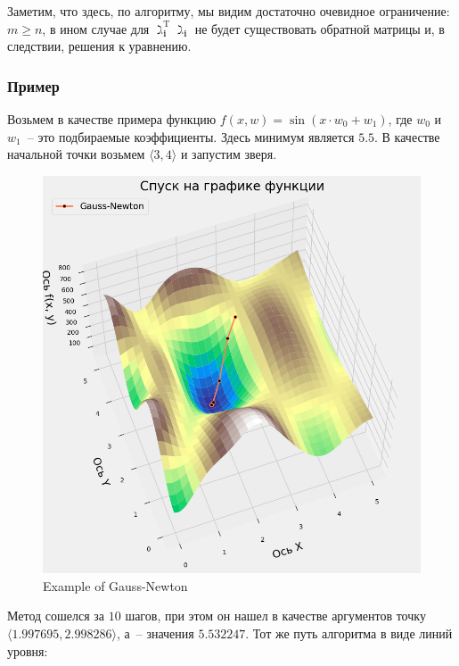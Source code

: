 \documentclass[12pt, a4paper, oneside, final]{article}
\begin{document}
	Заметим, что здесь, по алгоритму, мы видим достаточно очевидное ограничение: $m \geqslant n$, в ином случае для $\gimel_{\mathbf{i}}^{\mathrm{T}}\gimel_{\mathbf{i}}$ не будет существовать обратной матрицы и, в следствии, решения к уравнению.
	\subsubsection*{Пример}
	Возьмем в качестве примера функцию $f(x, w) = \sin{(x \cdot w_{0} + w_{1})}$, где $w_{0}$ и $w_{1}$~-- это подбираемые коэффициенты.
	Здесь минимум является $5.5$.
	В качестве начальной точки возьмем $\langle 3, 4 \rangle$ и запустим зверя.
	\begin{figure}[H]
		\centering
		\includegraphics[scale = 0.55]{Image/T1_GAUSS_NEWTON_3D_PLOT_1.png}
		\caption*{Example of Gauss-Newton}
	\end{figure}
	Метод сошелся за $10$ шагов, при этом он нашел в качестве аргументов точку $\langle 1.997695, 2.998286 \rangle$, а~-- значения $5.532247$.
	Тот же путь алгоритма в виде линий уровня:
\end{document}
